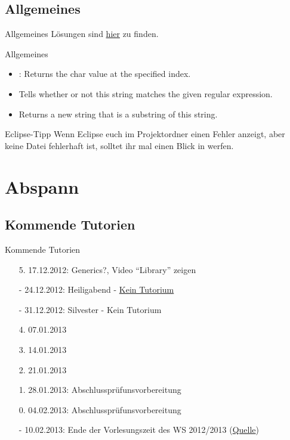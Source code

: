 \documentclass[usepdftitle=false,hyperref={pdfpagelabels=false}]{beamer}
\begin{document}
\subsection{Allgemeines}
\begin{frame}{Allgemeines}
    Lösungen sind \href{https://github.com/MartinThoma/prog-ws1213/tree/master/Blatt-03}{hier} zu finden.
\end{frame}
\begin{frame}{Allgemeines}
    \begin{itemize}[<+->]
        \item {}: 
              Returns the char value at the specified index.
        \item {}
              Tells whether or not this string matches the given regular expression.
        \item {} Returns a new string that is a substring of this string. 
    \end{itemize}
    \pause[\thebeamerpauses]
    \begin{block}{Eclipse-Tipp}
        Wenn Eclipse euch im Projektordner einen Fehler anzeigt, aber
        keine Datei fehlerhaft ist, solltet ihr mal einen 
        Blick in  werfen.
    \end{block}
\end{frame}

\section{Abspann}
\subsection{Kommende Tutorien}
\begin{frame}{Kommende Tutorien}
  \begin{itemize}
    \item[5.] 17.12.2012: Generics?, Video "`Library"' zeigen
    \item[-] 24.12.2012: Heiligabend - \href{http://www.fmc.uni-karlsruhe.de/faq/wann-sind-die-weihnachtsferien}{Kein Tutorium}
    \item[-] 31.12.2012: Silvester - Kein Tutorium
    \item[4.] 07.01.2013
    \item[3.] 14.01.2013
    \item[2.] 21.01.2013
    \item[1.] 28.01.2013: Abschlussprüfunsvorbereitung
    \item[0.] 04.02.2013: Abschlussprüfunsvorbereitung
    \item[-] 10.02.2013: Ende der Vorlesungszeit des WS 2012/2013 (\href{http://www.kit.edu/studieren/2873.php}{Quelle})
  \end{itemize}
\end{frame}

\end{document}
